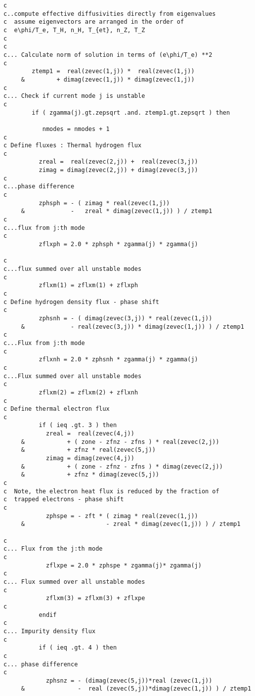 \begin{verbatim}
c
c..compute effective diffusivities directly from eigenvalues
c  assume eigenvectors are arranged in the order of
c  e\phi/T_e, T_H, n_H, T_{et}, n_Z, T_Z
c
c
c... Calculate norm of solution in terms of (e\phi/T_e) **2
c
        ztemp1 =  real(zevec(1,j)) *  real(zevec(1,j))
     &         + dimag(zevec(1,j)) * dimag(zevec(1,j))
c
c... Check if current mode j is unstable
c
        if ( zgamma(j).gt.zepsqrt .and. ztemp1.gt.zepsqrt ) then

           nmodes = nmodes + 1
c
c Define fluxes : Thermal hydrogen flux
c
          zreal =  real(zevec(2,j)) +  real(zevec(3,j))
          zimag = dimag(zevec(2,j)) + dimag(zevec(3,j))
c
c...phase difference
c
          zphsph = - ( zimag * real(zevec(1,j))
     &             -   zreal * dimag(zevec(1,j)) ) / ztemp1
c
c...flux from j:th mode
c
          zflxph = 2.0 * zphsph * zgamma(j) * zgamma(j)

c
c...flux summed over all unstable modes
c
          zflxm(1) = zflxm(1) + zflxph
c
c Define hydrogen density flux - phase shift
c
          zphsnh = - ( dimag(zevec(3,j)) * real(zevec(1,j))
     &             - real(zevec(3,j)) * dimag(zevec(1,j)) ) / ztemp1
c
c...Flux from j:th mode
c
          zflxnh = 2.0 * zphsnh * zgamma(j) * zgamma(j)
c
c...Flux summed over all unstable modes
c
          zflxm(2) = zflxm(2) + zflxnh
c
c Define thermal electron flux
c
          if ( ieq .gt. 3 ) then
            zreal =  real(zevec(4,j))
     &            + ( zone - zfnz - zfns ) * real(zevec(2,j))
     &            + zfnz * real(zevec(5,j))
            zimag = dimag(zevec(4,j))
     &            + ( zone - zfnz - zfns ) * dimag(zevec(2,j))
     &            + zfnz * dimag(zevec(5,j))
c
c  Note, the electron heat flux is reduced by the fraction of
c  trapped electrons - phase shift
c
            zphspe = - zft * ( zimag * real(zevec(1,j))
     &                       - zreal * dimag(zevec(1,j)) ) / ztemp1

c
c... Flux from the j:th mode
c
            zflxpe = 2.0 * zphspe * zgamma(j)* zgamma(j)
c
c... Flux summed over all unstable modes
c
            zflxm(3) = zflxm(3) + zflxpe
c
          endif
c
c... Impurity density flux
c
          if ( ieq .gt. 4 ) then
c
c... phase difference
c
            zphsnz = - (dimag(zevec(5,j))*real (zevec(1,j))
     &               -  real (zevec(5,j))*dimag(zevec(1,j)) ) / ztemp1


\end{verbatim}
